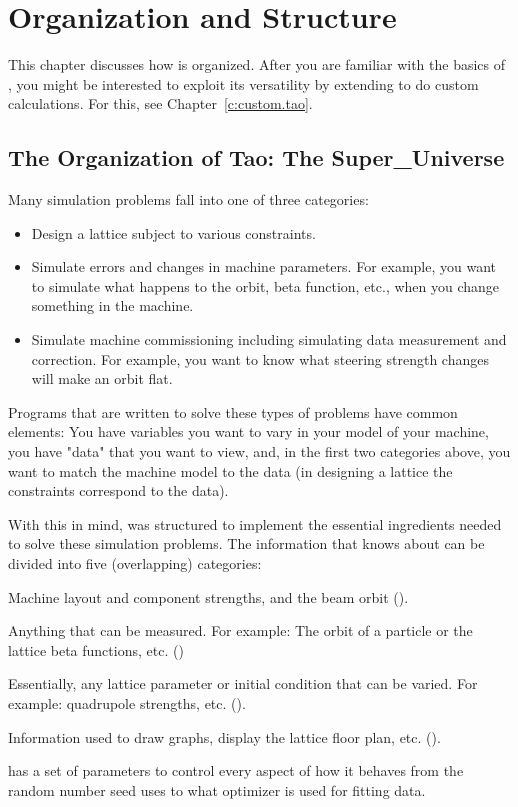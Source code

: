 \chapter{Organization and Structure}
\label{c:organization}

This chapter discusses how \tao is organized. After you are familiar with the basics of \tao, you
might be interested to exploit its versatility by extending \tao to do custom calculations. For
this, see Chapter~\ref{c:custom.tao}.

\section{The Organization of Tao: The Super\_Universe}
\label{s:organization}

Many simulation problems fall into one of three categories: 
\begin{itemize}
\item 
Design a lattice subject to various constraints.
\item
Simulate errors and changes in machine parameters. For example, you want to simulate what happens to
the orbit, beta function, etc., when you change something in the machine.
\item 
Simulate machine commissioning including simulating data measurement and correction. For example,
you want to know what steering strength changes will make an orbit flat.
\end{itemize}
Programs that are written to solve these types of problems have common elements: You have variables
you want to vary in your model of your machine, you have "data" that you want to view, and, in the
first two categories above, you want to match the machine model to the data (in designing a lattice
the constraints correspond to the data).

With this in mind, \tao was structured to implement the essential ingredients needed to solve these
simulation problems.  The information that \tao knows about can be divided into five (overlapping)
categories:
\begin{description}
  \item[Lattice] \Newline   
Machine layout and component strengths, and the beam orbit ().
  \item[Data] \Newline
Anything that can be measured.
For example: The orbit of a particle or the lattice beta 
functions, etc. ()
  \item[Variables] \Newline
Essentially, any lattice parameter or initial condition that can be varied. For example: quadrupole
strengths, etc. ().
  \item[Plotting]  \Newline
Information used to draw graphs, display the lattice 
floor plan, etc. ().
  \item[Global Parameters] \Newline
 \tao has a set of parameters to control every aspect of how it behaves from
the random number seed \tao uses to what optimizer is used for fitting data.
\end{description}

